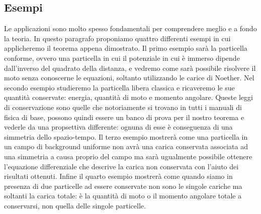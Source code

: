 \subsection{Esempi}

    Le applicazioni sono molto spesso fondamentali per comprendere meglio e a fondo la teoria. In questo paragrafo proponiamo quattro differenti esempi in cui applicheremo il teorema appena dimostrato. Il primo esempio sarà la particella conforme, ovvero una particella in cui il potenziale in cui è immerso dipende dall'inverso del  quadrato della distanza, e vedremo come sarà possibile risolvere il moto senza conoscerne le equazioni, soltanto utilizzando le carice di Noether. Nel secondo esempio studieremo la particella libera classica e ricaveremo le sue quantità conservate: energia, quantità di moto e momento angolare. Queste leggi di conservazione sono quelle che notoriamente si trovano in tutti i manuali di fisica di base, possono quindi essere un banco di prova per il nostro teorema e vederle da una propsettiva differente: ognuna di esse è conseguenza di una simmetria dello spazio-tempo. Il terzo esempio mostrerà come una particella in un campo di background uniforme non avrà una carica conservata associata ad una simmetria a causa proprio del campo ma sarà ugualmente possibile ottenere l'equazione differenziale che descrive la carica non conservata con l'aiuto dei risultati ottenuti. Infine il quarto esempio mostrerà come quando siamo in presenza di due particelle ad essere conservate non sono le singole cariche ma soltanti la carica totale: è la quantità di moto o il momento angolare totale a conservarsi, non quella delle singole particelle. 

